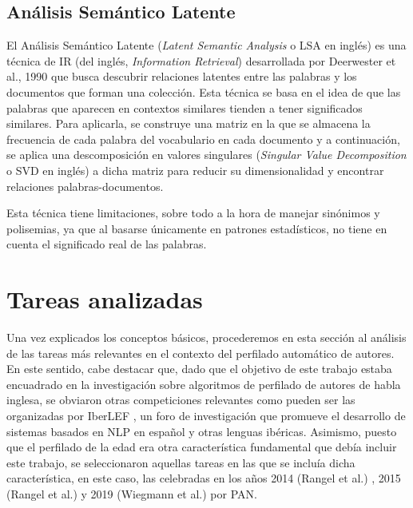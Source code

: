 \subsection{Análisis Semántico Latente}
\label{sec:analisis_semantico_latente}

El Análisis Semántico Latente (\textit{Latent Semantic Analysis} o LSA en inglés) es una técnica de IR (del inglés, \textit{Information Retrieval}) desarrollada por Deerwester et al., 1990 \cite{deerwester1990indexing}
que busca descubrir relaciones latentes
entre las palabras y los documentos que forman una colección. Esta técnica se basa
en el idea de que las palabras que aparecen en contextos similares
tienden a tener significados similares. Para aplicarla, se construye una matriz en la que se almacena la frecuencia de cada palabra del vocabulario en cada documento y
a continuación, se aplica una descomposición en valores singulares (\textit{Singular Value Decomposition} o SVD en inglés) a dicha matriz para reducir su dimensionalidad
y encontrar relaciones palabras-documentos.

\bigskip
Esta técnica tiene limitaciones, sobre todo a la hora de manejar sinónimos y polisemias, ya que al basarse únicamente en patrones estadísticos,
no tiene en cuenta el significado real de las palabras.

\section{Tareas analizadas}
\label{sec:competiciones_analizadas}

Una vez explicados los conceptos básicos, procederemos en esta sección al análisis de las tareas más relevantes en el contexto
del perfilado automático de autores. En este sentido, cabe destacar que, dado que el objetivo de este trabajo estaba encuadrado en
la investigación sobre algoritmos de perfilado de autores de habla inglesa, se obviaron otras competiciones relevantes como pueden ser
las organizadas por IberLEF \cite{iberlef}, un foro de investigación que promueve el desarrollo de sistemas basados en NLP en español y otras
lenguas ibéricas.
Asimismo, puesto que el perfilado de la edad era otra característica fundamental que debía incluir este trabajo, se seleccionaron aquellas tareas
en las que se incluía dicha característica, en este caso, las celebradas en los años 2014 (Rangel et al.) \cite{rangel2014overview}, 2015 (Rangel et al.) \cite{rangel2015overview} y 2019 (Wiegmann et al.) \cite{wiegmann2019overview}
por PAN.


